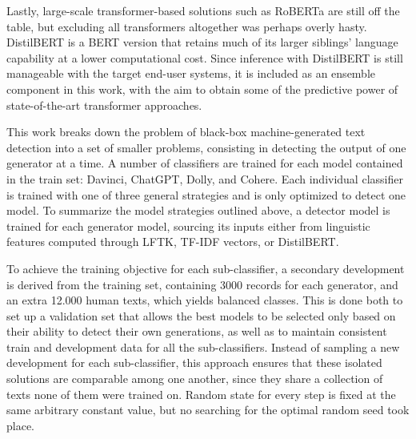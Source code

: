Lastly, large-scale transformer-based solutions such as RoBERTa are still off the table, but excluding all transformers altogether was perhaps overly hasty.
DistilBERT \citep{sanh2020distilbertdistilledversionbert} is a BERT version that retains much of its larger siblings' language capability at a lower computational cost.
Since inference with DistilBERT is still manageable with the target end-user systems, it is included as an ensemble component in this work, with the aim to obtain some of the predictive power of state-of-the-art transformer approaches.

This work breaks down the problem of black-box machine-generated text detection into a set of smaller problems, consisting in detecting the output of one generator at a time.
A number of classifiers are trained for each model contained in the train set: Davinci, ChatGPT, Dolly, and Cohere.
Each individual classifier is trained with one of three general strategies and is only optimized to detect one model.
To summarize the model strategies outlined above, a detector model is trained for each generator model, sourcing its inputs either from linguistic features computed through LFTK, TF-IDF vectors, or DistilBERT.

To achieve the training objective for each sub-classifier, a secondary development is derived from the training set, containing 3000 records for each generator, and an extra 12.000 human texts, which yields balanced classes.
This is done both to set up a validation set that allows the best models to be selected only based on their ability to detect their own generations, as well as to maintain consistent train and development data for all the sub-classifiers.
Instead of sampling a new development for each sub-classifier, this approach ensures that these isolated solutions are comparable among one another, since they share a collection of texts none of them were trained on.
Random state for every step is fixed at the same arbitrary constant value, but no searching for the optimal random seed took place.

